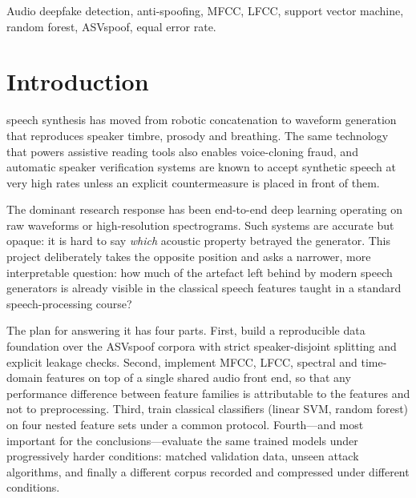 \documentclass[journal,10pt]{IEEEtran}
\begin{document}
\begin{IEEEkeywords}
Audio deepfake detection, anti-spoofing, MFCC, LFCC, support vector machine,
random forest, ASVspoof, equal error rate.
\end{IEEEkeywords}

\section{Introduction}
 speech synthesis has moved from robotic
concatenation to waveform generation that reproduces speaker timbre,
prosody and breathing. The same technology that powers assistive reading
tools also enables voice-cloning fraud, and automatic speaker verification
systems are known to accept synthetic speech at very high rates unless an
explicit countermeasure is placed in front of them.

The dominant research response has been end-to-end deep learning operating
on raw waveforms or high-resolution spectrograms. Such systems are accurate
but opaque: it is hard to say \emph{which} acoustic property betrayed the
generator. This project deliberately takes the opposite position and asks a
narrower, more interpretable question: how much of the artefact left behind
by modern speech generators is already visible in the classical speech
features taught in a standard speech-processing course?

The plan for answering it has four parts. First, build a reproducible data
foundation over the ASVspoof corpora with strict speaker-disjoint splitting
and explicit leakage checks. Second, implement MFCC, LFCC, spectral and
time-domain features on top of a single shared audio front end, so that any
performance difference between feature families is attributable to the
features and not to preprocessing. Third, train classical classifiers
(linear SVM, random forest) on four nested feature sets under a common
protocol. Fourth---and most important for the conclusions---evaluate the
same trained models under progressively harder conditions: matched
validation data, unseen attack algorithms, and finally a different corpus
recorded and compressed under different conditions.

\end{document}
